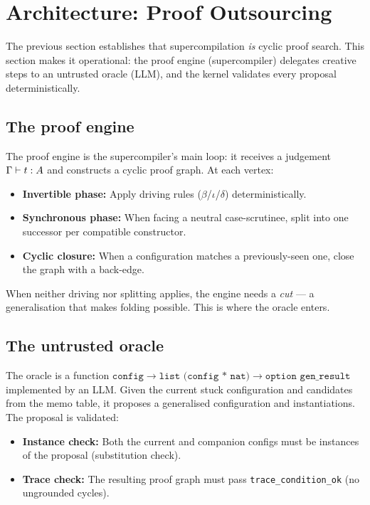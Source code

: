 \section{Architecture: Proof Outsourcing}
\label{sec:design}

The previous section establishes that supercompilation \emph{is} cyclic proof
search.  This section makes it operational: the proof engine (supercompiler)
delegates creative steps to an untrusted oracle (LLM), and the kernel validates
every proposal deterministically.

\subsection{The proof engine}

The proof engine is the supercompiler's main loop: it receives a judgement
$\Gamma \vdash t : A$ and constructs a cyclic proof graph.  At each vertex:
\begin{itemize}[leftmargin=*]
\item \textbf{Invertible phase:} Apply driving rules ($\beta$/$\iota$/$\delta$) deterministically.
\item \textbf{Synchronous phase:} When facing a neutral case-scrutinee, split
  into one successor per compatible constructor.
\item \textbf{Cyclic closure:} When a configuration matches a previously-seen
  one, close the graph with a back-edge.
\end{itemize}

When neither driving nor splitting applies, the engine needs a \emph{cut} --- a
generalisation that makes folding possible.  This is where the oracle enters.

\subsection{The untrusted oracle}

The oracle is a function $\texttt{config} \to \texttt{list (config * nat)}
\to \texttt{option gen\_result}$ implemented by an LLM.  Given the current
stuck configuration and candidates from the memo table, it proposes a
generalised configuration and instantiations.  The proposal is validated:
\begin{itemize}[leftmargin=*]
\item \textbf{Instance check:} Both the current and companion configs must be
  instances of the proposal (substitution check).
\item \textbf{Trace check:} The resulting proof graph must pass
  \texttt{trace\_condition\_ok} (no ungrounded cycles).
\end{itemize}

